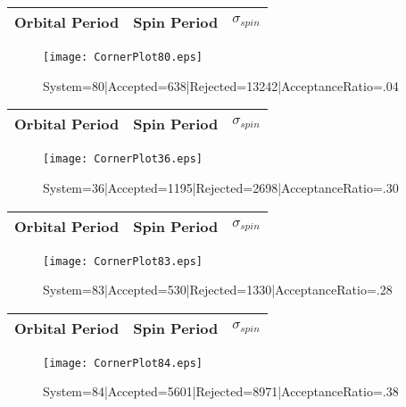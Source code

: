 \documentclass[10pt]{article}
\begin{document}
\begin{center}
        \begin{tabular}{|c|c|c|}
        \hline
Orbital Period & Spin Period & $\sigma_{spin}$ \\
 \hline
        \end{tabular}
        \end{center}
\begin{figure}[h] 
        \texttt{[image: CornerPlot80.eps]}
        \caption{System=80|Accepted=638|Rejected=13242|AcceptanceRatio=.04}
        \label{S80}
        \centering
        \end{figure}
\begin{center}
        \begin{tabular}{|c|c|c|}
        \hline
Orbital Period & Spin Period & $\sigma_{spin}$ \\
 \hline
        \end{tabular}
        \end{center}
\begin{figure}[h] 
        \texttt{[image: CornerPlot36.eps]}
        \caption{System=36|Accepted=1195|Rejected=2698|AcceptanceRatio=.30}
        \label{S36}
        \centering
        \end{figure}
\begin{center}
        \begin{tabular}{|c|c|c|}
        \hline
Orbital Period & Spin Period & $\sigma_{spin}$ \\
 \hline
        \end{tabular}
        \end{center}
\begin{figure}[h] 
        \texttt{[image: CornerPlot83.eps]}
        \caption{System=83|Accepted=530|Rejected=1330|AcceptanceRatio=.28}
        \label{S83}
        \centering
        \end{figure}
\begin{center}
        \begin{tabular}{|c|c|c|}
        \hline
Orbital Period & Spin Period & $\sigma_{spin}$ \\
 \hline
        \end{tabular}
        \end{center}
\begin{figure}[h] 
        \texttt{[image: CornerPlot84.eps]}
        \caption{System=84|Accepted=5601|Rejected=8971|AcceptanceRatio=.38}
        \label{S84}
        \centering
        \end{figure}
\end{document}
